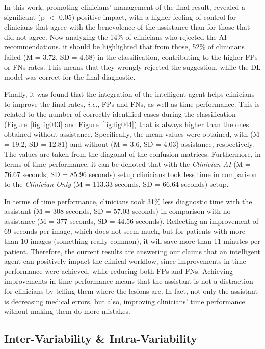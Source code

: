 In this work, promoting clinicians' management of the final result, revealed a significant (p $<$ 0.05) positive impact, with a higher feeling of control for clinicians that agree with the benevolence of the assistance than for those that did not agree.
Now analyzing the 14\% of clinicians who rejected the \ac{AI} recommendations, it should be highlighted that from those, 52\% of clinicians failed (M = 3.72, SD = 4.68) in the classification, contributing to the higher \acp{FP} or \acp{FN} rates.
This means that they wrongly rejected the suggestion, while the \ac{DL} model was correct for the final diagnostic.

Finally, it was found that the integration of the intelligent agent helps clinicians to improve the final rates, {\it i.e.}, \acp{FP} and \acp{FN}, as well as time performance.
This is related to the number of correctly identified cases during the classification (Figure~\ref{fig:fig043} and Figure~\ref{fig:fig044}) that is always higher than the ones obtained without assistance.
Specifically, the mean values were obtained, with (M = 19.2, SD = 12.81) and without (M = 3.6, SD = 4.03) assistance, respectively.
The values are taken from the diagonal of the confusion matrices.
Furthermore, in terms of time performance, it can be denoted that with the {\it Clinician-AI} (M = 76.67 seconds, SD = 85.96 seconds) setup clinicians took less time in comparison to the {\it Clinician-Only} (M = 113.33 seconds, SD = 66.64 seconds) setup.

In terms of time performance, clinicians took 31\% less diagnostic time with the assistant (M = 308 seconds, SD = 57.03 seconds) in comparison with no assistance (M = 377 seconds, SD = 44.56 seconds).
Reflecting an improvement of 69 seconds per image, which does not seem much, but for patients with more than 10 images (something really common), it will save more than 11 minutes per patient.
Therefore, the current results are answering our claims that an intelligent agent can positively impact the clinical workflow, since improvements in time performance were achieved, while reducing both \acp{FP} and \acp{FN}.
Achieving improvements in time performance means that the assistant is not a distraction for clinicians by telling them where the lesions are.
In fact, not only the assistant is decreasing medical errors, but also, improving clinicians' time performance without making them do more mistakes.

\subsection{Inter-Variability \& Intra-Variability}
\label{sec:app003004008}

